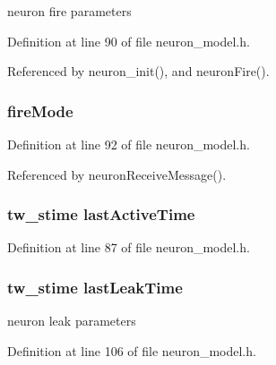 neuron fire parameters 



Definition at line 90 of file neuron\+\_\+model.\+h.



Referenced by neuron\+\_\+init(), and neuron\+Fire().

\hypertarget{structneuron_state_a55890f9e021064df30e9d18a9df98845}{}
\subsubsection[{fire\+Mode}]{ fire\+Mode}\label{structneuron_state_a55890f9e021064df30e9d18a9df98845}


Definition at line 92 of file neuron\+\_\+model.\+h.



Referenced by neuron\+Receive\+Message().

\hypertarget{structneuron_state_a0658ad1f8b57a00589c6ea84f9a4ab13}{}
\subsubsection[{last\+Active\+Time}]{\setlength{\rightskip}{0pt plus 5cm}tw\+\_\+stime last\+Active\+Time}\label{structneuron_state_a0658ad1f8b57a00589c6ea84f9a4ab13}


Definition at line 87 of file neuron\+\_\+model.\+h.

\hypertarget{structneuron_state_a6f4e4d8fc1cf0257b486e01f628d2656}{}
\subsubsection[{last\+Leak\+Time}]{\setlength{\rightskip}{0pt plus 5cm}tw\+\_\+stime last\+Leak\+Time}\label{structneuron_state_a6f4e4d8fc1cf0257b486e01f628d2656}


neuron leak parameters 



Definition at line 106 of file neuron\+\_\+model.\+h.

\hypertarget{structneuron_state_ad0271f69fc01192f4f85b74d9bee06de}{}
